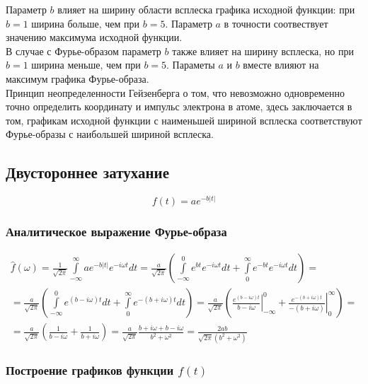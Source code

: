 \documentclass[a5paper, 10pt]{article}
\theoremstyle{definition}
\theoremstyle{plain}
\theoremstyle{remark}
\begin{document}
Параметр $b$ влияет на ширину области всплеска графика исходной функции: при $b=1$ ширина больше, чем при $b=5$. Параметр $a$ в точности соотвествует значению максимума исходной функции.\\

В случае с Фурье-образом параметр $b$ также влияет на ширину всплеска, но при $b=1$ ширина меньше, чем при $b=5$. Параметы $a$ и $b$ вместе влияют на максимум графика Фурье-образа.\\

Принцип неопределенности Гейзенберга о том, что невозможно одновременно точно определить координату и импульс электрона в атоме, здесь заключается в том, графикам исходной функции с наименьшей шириной всплеска соответствуют Фурье-образы с наибольшей шириной всплеска.


\newpage
\subsection{Двустороннее затухание}

\begin{equation}
f(t) = a e^{-b|t|}
\end{equation}


\subsubsection{Аналитическое выражение Фурье-образа}

\begin{multline}
\hat{f}(\omega) =
 \frac{1}{\sqrt{2 \pi}} \int \limits_{-\infty}^{\infty} a e^{-b|t|} e^{-i \omega t} dt =  \frac{a}{\sqrt{2 \pi}}  \left( \int \limits_{-\infty}^{0} e^{b t} e^{-i \omega t} dt  + \int \limits_{0}^{\infty} e^{-b t} e^{-i \omega t} dt  \right) = \\
=  \frac{a}{\sqrt{2 \pi}}  \left( \int \limits_{-\infty}^{0} e^{(b-i \omega) t} dt  + \int \limits_{0}^{\infty}e^{-(b + i \omega) t} dt  \right) 
= \frac{a}{\sqrt{2 \pi}}  \left(  \left. \frac{e^{(b-i \omega) t}}{b-i \omega} \right|_{-\infty}^{0} + \left. \frac{e^{-(b + i \omega) t}}{-(b + i \omega)} \right|_{0}^{\infty}  \right) =\\
=\frac{a}{\sqrt{2 \pi}}  \left( \frac{1}{b-i \omega} + \frac{1}{b + i \omega}  \right) =
\frac{a}{\sqrt{2 \pi}}   \frac{b + i \omega +b - i \omega}{b^2 + \omega^2} = \frac{2ab}{\sqrt{2 \pi} (b^2 + \omega^2)}
\end{multline}

\subsubsection{Построение графиков функции $f(t)$}
\end{document}
